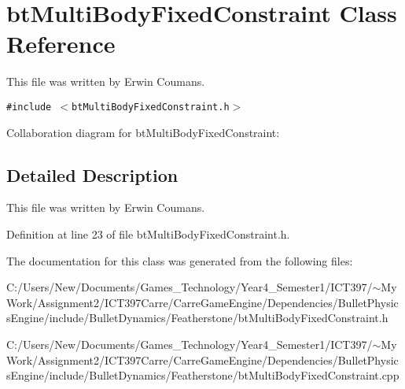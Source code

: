 \hypertarget{classbt_multi_body_fixed_constraint}{
\section{btMultiBodyFixedConstraint Class Reference}
\label{classbt_multi_body_fixed_constraint}
}
This file was written by Erwin Coumans.  


{\tt \#include $<$btMultiBodyFixedConstraint.h$>$}

Collaboration diagram for btMultiBodyFixedConstraint:

\subsection{Detailed Description}
This file was written by Erwin Coumans. 

Definition at line 23 of file btMultiBodyFixedConstraint.h.

The documentation for this class was generated from the following files:\begin{CompactItemize}
\item 
C:/Users/New/Documents/Games\_\-Technology/Year4\_\-Semester1/ICT397/$\sim$My Work/Assignment2/ICT397Carre/CarreGameEngine/Dependencies/BulletPhysicsEngine/include/BulletDynamics/Featherstone/btMultiBodyFixedConstraint.h\item 
C:/Users/New/Documents/Games\_\-Technology/Year4\_\-Semester1/ICT397/$\sim$My Work/Assignment2/ICT397Carre/CarreGameEngine/Dependencies/BulletPhysicsEngine/include/BulletDynamics/Featherstone/btMultiBodyFixedConstraint.cpp\end{CompactItemize}
